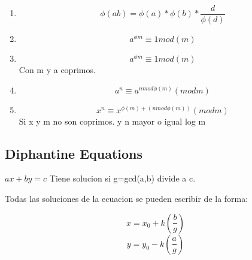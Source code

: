 \begin{enumerate}
\begin{enumerate}
\item
\begin{equation}
  \phi (ab) = \phi(a)*\phi(b) * \frac{d}{\phi(d)}
\end{equation}

\item
\begin{equation}
  a^{\phi m} \equiv 1 mod(m)
\end{equation}

\item
\begin{equation}
  a^{\phi m} \equiv 1 mod(m)
\end{equation}
Con m y a coprimos.

\item
\begin{equation}
  a^{n} \equiv a^{n mod \phi (m)} (mod m)
\end{equation}

\item
\begin{equation}
  x^{n} \equiv x^{\phi (m) +( n mod \phi(m))} (mod m)
\end{equation}
Si x y m no son coprimos. y n mayor o igual log m

\end{enumerate}
\subsection{Diphantine Equations}
$ax+by=c$
Tiene solucion si g=gcd(a,b) divide a c.

Todas las soluciones de la ecuacion se pueden escribir de la forma:

\begin{equation}
  x=x_0 +k(\frac{b}{g})
\end{equation}
\begin{equation}
  y=y_0 - k (\frac{a}{g})
\end{equation}
\end{enumerate}
